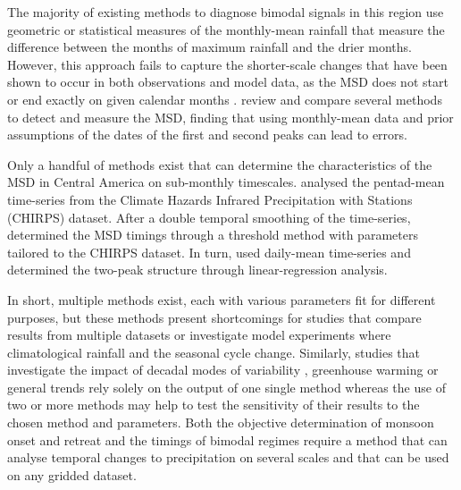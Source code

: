 The majority of existing methods to diagnose bimodal signals in this region use geometric or statistical measures of the monthly-mean rainfall that measure the difference between the months of maximum rainfall and the drier months.  
However, this approach fails to capture the shorter-scale changes that have been shown to occur in both observations and model data, as the MSD does not start or end exactly on given calendar months \citep{magana1999,garciafranco2020}.  \cite{zhao2021} review and compare several methods to detect and measure the MSD, finding that using monthly-mean data and prior assumptions of the dates of the first and second peaks can lead to errors.  %

Only a handful of methods exist that can determine the characteristics of the MSD in Central America on sub-monthly timescales. \cite{anderson2019multiscale} analysed the pentad-mean time-series from the   Climate Hazards Infrared Precipitation with Stations (CHIRPS) dataset. After a double temporal smoothing of the time-series, \cite{anderson2019multiscale} determined the MSD timings through a threshold method with parameters tailored to the CHIRPS dataset.
In turn, \cite{zhao2020} used daily-mean time-series and determined the two-peak structure through linear-regression analysis.

In short, multiple methods exist, each with various parameters fit for different purposes, but these methods present shortcomings for studies that compare results from multiple datasets or investigate model experiments where climatological rainfall and the seasonal cycle change.
Similarly, studies that investigate the impact of decadal modes of variability \citep[e.g.][]{arias2012}, greenhouse warming \citep[e.g][]{geil2013} or general trends \citep[e.g.][]{Sahana_2015} rely solely on the output of one single method whereas the use of two or more methods may help to test the sensitivity of their results to the chosen method and parameters. 
Both the objective determination of monsoon onset and retreat and the timings of bimodal regimes require a method that can analyse temporal changes to precipitation on several scales and that can be used on any gridded dataset. 




